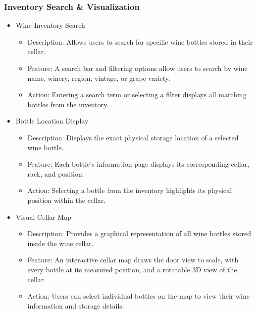 \documentclass[conference]{IEEEtran}
\begin{document}
\subsubsection{Inventory Search \& Visualization}
\begin{itemize}
    \item Wine Inventory Search
    \begin{itemize}
        \item Description: Allows users to search for specific wine bottles stored in their cellar.
        \item Feature: A search bar and filtering options allow users to search by wine name, winery, region, vintage, or grape variety.
        \item Action: Entering a search term or selecting a filter displays all matching bottles from the inventory.
    \end{itemize}

    \item Bottle Location Display
    \begin{itemize}
        \item Description: Displays the exact physical storage location of a selected wine bottle.
        \item Feature: Each bottle's information page displays its corresponding cellar, rack, and position.
        \item Action: Selecting a bottle from the inventory highlights its physical position within the cellar.
    \end{itemize}

    \item Visual Cellar Map
    \begin{itemize}
        \item Description: Provides a graphical representation of all wine bottles stored inside the wine cellar.
        \item Feature: An interactive cellar map draws the door view to scale, with every bottle at its measured position, and a rotatable 3D view of the cellar.
        \item Action: Users can select individual bottles on the map to view their wine information and storage details.
    \end{itemize}
\end{itemize}
\end{document}
